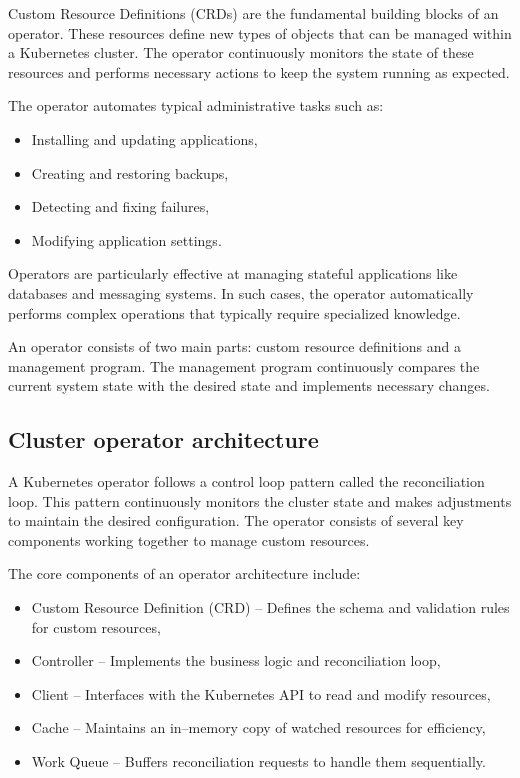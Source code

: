 Custom Resource Definitions (CRDs) are the fundamental building blocks of an operator.
These resources define new types of objects that can be managed within a Kubernetes cluster.
The operator continuously monitors the state of these resources and performs necessary actions to keep the system running as expected.

The operator automates typical administrative tasks such as:
\begin{itemize}
    \item Installing and updating applications,
    \item Creating and restoring backups,
    \item Detecting and fixing failures,
    \item Modifying application settings.
\end{itemize}

Operators are particularly effective at managing stateful applications like databases and messaging systems.
In such cases, the operator automatically performs complex operations that typically require specialized knowledge.

An operator consists of two main parts: custom resource definitions and a management program.
The management program continuously compares the current system state with the desired state and implements necessary changes.

\subsection{Cluster operator architecture}

A Kubernetes operator follows a control loop pattern called the reconciliation loop.
This pattern continuously monitors the cluster state and makes adjustments to maintain the desired configuration.
The operator consists of several key components working together to manage custom resources.

The core components of an operator architecture include:

\begin{itemize}
    \item Custom Resource Definition (CRD) -- Defines the schema and validation rules for custom resources,
    \item Controller -- Implements the business logic and reconciliation loop,
    \item Client -- Interfaces with the Kubernetes API to read and modify resources,
    \item Cache -- Maintains an in--memory copy of watched resources for efficiency,
    \item Work Queue -- Buffers reconciliation requests to handle them sequentially.
\end{itemize}

